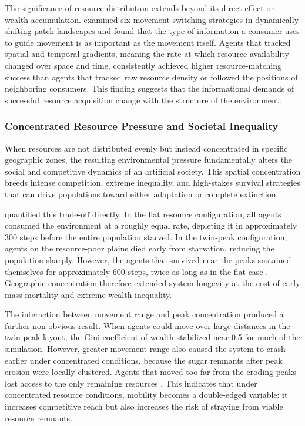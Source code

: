\documentclass{icsthesis}
\begin{document}
\begin{mainmatter}
The significance of resource distribution extends beyond its direct effect on wealth accumulation. \citet{Fagan2022} examined six movement-switching strategies in dynamically shifting patch landscapes and found that the type of information a consumer uses to guide movement is as important as the movement itself. Agents that tracked spatial and temporal gradients, meaning the rate at which resource availability changed over space and time, consistently achieved higher resource-matching success than agents that tracked raw resource density or followed the positions of neighboring consumers. This finding suggests that the informational demands of successful resource acquisition change with the structure of the environment.

\subsubsection{Concentrated Resource Pressure and Societal Inequality}
When resources are not distributed evenly but instead concentrated in specific geographic zones, the resulting environmental pressure fundamentally alters the social and competitive dynamics of an artificial society. This spatial concentration breeds intense competition, extreme inequality, and high-stakes survival strategies that can drive populations toward either adaptation or complete extinction.

\citet{Hawick2014} quantified this trade-off directly. In the flat resource configuration, all agents consumed the environment at a roughly equal rate, depleting it in approximately 300 steps before the entire population starved. In the twin-peak configuration, agents on the resource-poor plains died early from starvation, reducing the population sharply. However, the agents that survived near the peaks sustained themselves for approximately 600 steps, twice as long as in the flat case \citep{Hawick2014}. Geographic concentration therefore extended system longevity at the cost of early mass mortality and extreme wealth inequality.

The interaction between movement range and peak concentration produced a further non-obvious result. When agents could move over large distances in the twin-peak layout, the Gini coefficient of wealth stabilized near 0.5 for much of the simulation. However, greater movement range also caused the system to crash earlier under concentrated conditions, because the sugar remnants after peak erosion were locally clustered. Agents that moved too far from the eroding peaks lost access to the only remaining resources \citep{Hawick2014}. This indicates that under concentrated resource conditions, mobility becomes a double-edged variable: it increases competitive reach but also increases the risk of straying from viable resource remnants.


\end{mainmatter}
\end{document}
